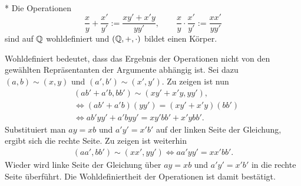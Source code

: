 \begin{Satz}\mbox{}\\*
Die Operationen
\[\frac{x}{y}+\frac{x'}{y'} := \frac{xy'+x'y}{yy'},
\qquad\frac{x}{y}\cdot \frac{x'}{y'} := \frac{xx'}{yy'}\]
sind auf $\mathbb Q$ wohldefiniert und $(\mathbb Q,+,\cdot)$ bildet einen Körper.
\end{Satz}
 Wohldefiniert bedeutet, dass das Ergebnis der
Operationen nicht von den gewählten Repräsentanten der Argumente
abhängig ist. Sei dazu $(a,b)\sim (x,y)$ und
$(a',b')\sim (x',y')$. Zu zeigen ist nun
\begin{align*}
&(ab'+a'b,bb')\sim (xy'+x'y,yy'),\\
&\iff (ab'+a'b)(yy') = (xy'+x'y)(bb')\\
&\iff ab' yy' + a'byy' = xy'bb'+x'ybb'.
\end{align*}
Substituiert man $ay=xb$ und $a'y'=x'b'$ auf
der linken Seite der Gleichung, ergibt sich die rechte Seite.
Zu zeigen ist weiterhin
\begin{align*}
(aa',bb')\sim (xx',yy')
\iff aa'yy' = xx'bb'.
\end{align*}
Wieder wird linke Seite der Gleichung über $ay=xb$
und $a'y'=x'b'$ in die rechte Seite überführt.
Die Wohldefiniertheit der Operationen ist damit bestätigt.

